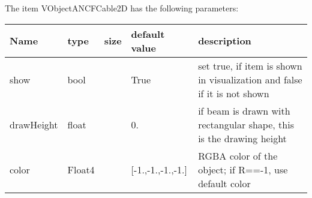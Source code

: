 The item VObjectANCFCable2D has the following parameters:
\begin{center}
  \footnotesize
  \begin{longtable}{| p{4.5cm} | p{2.5cm} | p{0.5cm} | p{2.5cm} | p{6cm} |}
    \hline
    \bf Name & \bf type & \bf size & \bf default value & \bf description \\ \hline
    show &     bool &      &     True &     set true, if item is shown in visualization and false if it is not shown\\ \hline
    drawHeight &     float &      &     0. &     if beam is drawn with rectangular shape, this is the drawing height\\ \hline
    color &     Float4 &      &     [-1.,-1.,-1.,-1.] &     RGBA color of the object; if R==-1, use default color\\ \hline
	  \end{longtable}
	\end{center}

